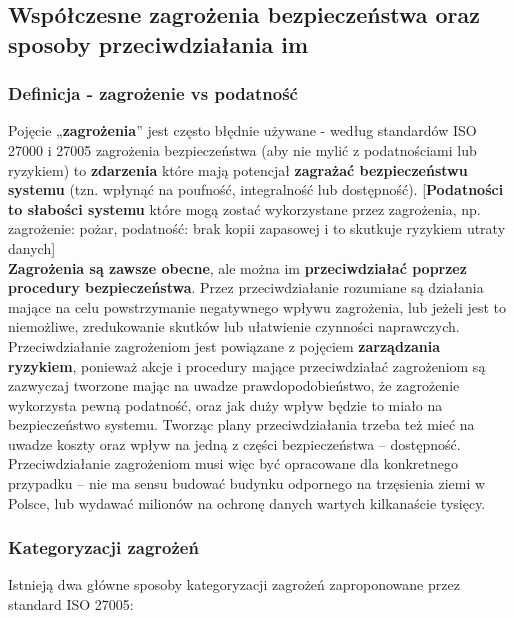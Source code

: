 \subsection{Współczesne zagrożenia bezpieczeństwa oraz sposoby przeciwdziałania im}

\subsubsection{Definicja - zagrożenie vs podatność}

Pojęcie „\textbf{zagrożenia}” jest często błędnie używane - według standardów ISO 27000 i 27005 zagrożenia bezpieczeństwa (aby nie mylić z podatnościami lub ryzykiem) to \textbf{zdarzenia} które mają potencjał \textbf{zagrażać bezpieczeństwu systemu} (tzn. wpłynąć na poufność, integralność lub dostępność). [\textbf{Podatności to słabości systemu} które mogą zostać wykorzystane przez zagrożenia, np. zagrożenie: pożar, podatność: brak kopii zapasowej i to skutkuje ryzykiem utraty danych] \\

\textbf{Zagrożenia są zawsze obecne}, ale można im \textbf{przeciwdziałać poprzez procedury bezpieczeństwa}. Przez przeciwdziałanie rozumiane są działania mające na celu powstrzymanie negatywnego wpływu zagrożenia, lub jeżeli jest to niemożliwe, zredukowanie skutków lub ułatwienie czynności naprawczych. \\

Przeciwdziałanie zagrożeniom jest powiązane z pojęciem \textbf{zarządzania ryzykiem}, ponieważ akcje i procedury mające przeciwdziałać zagrożeniom są zazwyczaj tworzone mając na uwadze prawdopodobieństwo, że zagrożenie wykorzysta pewną podatność, oraz jak duży wpływ będzie to miało na bezpieczeństwo systemu. Tworząc plany przeciwdziałania trzeba też mieć na uwadze koszty oraz wpływ na jedną z części bezpieczeństwa – dostępność. Przeciwdziałanie zagrożeniom musi więc być opracowane dla konkretnego przypadku – nie ma sensu budować budynku odpornego na trzęsienia ziemi w Polsce, lub wydawać milionów na ochronę danych wartych kilkanaście tysięcy. \\

\subsubsection{Kategoryzacji zagrożeń}

Istnieją dwa główne sposoby kategoryzacji zagrożeń zaproponowane przez standard ISO 27005:

